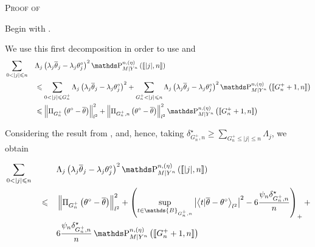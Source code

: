 \begin{pro}{\textsc{Proof of } \\}\label{PROD.4.2}

Begin with .

We use this first decomposition in order to use  and 
\begin{alignat*}{2}
& \sum\limits_{0 < \vert j \vert \leq n} && \Lambda_{j} \left(\lambda_{j} \overline{\theta}_{j} - \lambda_{j} \theta^{\circ}_{j}\right)^{2} \P_{M \vert Y^{n}}^{n, (\eta)}\left(\llbracket \vert j \vert, n \rrbracket\right)\\
& && \leq \sum\limits_{0 < \vert j \vert \leq G^{+}_{n}} \Lambda_{j} \left(\lambda_{j} \overline{\theta}_{j} - \lambda_{j} \theta^{\circ}_{j}\right)^{2} + \sum\limits_{G^{+}_{n} < \vert j \vert \leq n} \Lambda_{j} \left(\lambda_{j} \overline{\theta}_{j} - \lambda_{j} \theta^{\circ}_{j}\right)^{2} \P_{M \vert Y^{n}}^{n, (\eta)}\left(\llbracket G^{+}_{n} + 1, n \rrbracket\right)\\
& && \leq \left\Vert \Pi_{G^{+}_{n}}\left(\theta^{\circ} - \overline{\theta}\right) \right\Vert_{l^{2}}^{2} + \left\Vert \Pi_{G^{+}_{n}, n}\left(\theta^{\circ} - \overline{\theta}\right)\right\Vert_{l^{2}}^{2} \P_{M \vert Y^{n}}^{n, (\eta)}\left(\llbracket G^{+}_{n} + 1, n \rrbracket\right)\\
\end{alignat*}

Considering the result from , and, hence, taking $\delta^{\star}_{G^{+}_{n}, n} \geq \sum\limits_{G^{+}_{n} \leq \vert j \vert \leq n} \Lambda_{j}$, we obtain

\begin{alignat*}{3}
& \sum\limits_{0 < \vert j \vert \leq n} && && \Lambda_{j} \left(\lambda_{j} \overline{\theta}_{j} - \lambda_{j} \theta^{\circ}_{j}\right)^{2} \P_{M \vert Y^{n}}^{n, (\eta)}\left(\llbracket \vert j \vert, n \rrbracket\right)\\
& && \leq && \left\Vert \Pi_{G^{+}_{n}}\left(\theta^{\circ} - \overline{\theta}\right) \right\Vert_{l^{2}}^{2} + \left(\sup\limits_{t \in \mathds{B}_{G^{+}_{n}, n}} \left\vert \left\langle t \vert \overline{\theta} - \theta^{\circ} \right\rangle_{l^{2}}\right\vert^{2} - 6 \frac{\psi_{n} \delta^{\star}_{G^{+}_{n}, n}}{n} \right)_{+} +\\
& && && 6 \frac{\psi_{n} \delta^{\star}_{G^{+}_{n}, n}}{n} \P_{M \vert Y^{n}}^{n, (\eta)}\left(\llbracket G^{+}_{n} + 1, n \rrbracket\right)
\end{alignat*}


\end{pro}
